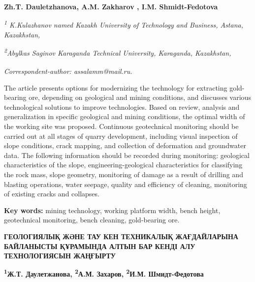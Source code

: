 
\begin{articleheader}

{\bfseries
Zh.T. Dauletzhanova,
A.M. Zakharov\textsuperscript{\envelope } ,
I.M. Shmidt-Fedotova}
\end{articleheader}

\begin{affiliation}
\emph{\textsuperscript{1} K.Kulazhanov named Kazakh University of Technology and Business, Astana, Kazakhstan,}

\emph{\textsuperscript{2}Abylkas Saginov Karaganda Technical University, Karaganda, Kazakhstan,}

\raggedright \textsuperscript{\envelope }{\em Correspondent-author: \emph{assalamm@mail.ru.}}
\end{affiliation}

The article presents options for modernizing the technology for
extracting gold-bearing ore, depending on geological and mining
conditions, and discusses various technological solutions to improve
technologies. Based on review, analysis and generalization in specific
geological and mining conditions, the optimal width of the working site
was proposed. Continuous geotechnical monitoring should be carried out
at all stages of quarry development, including visual inspection of
slope conditions, crack mapping, and collection of deformation and
groundwater data. The following information should be recorded during
monitoring: geological characteristics of the slope,
engineering-geological characteristics for classifying the rock mass,
slope geometry, monitoring of damage as a result of drilling and
blasting operations, water seepage, quality and efficiency of cleaning,
monitoring of existing cracks and collapses.

{\bfseries Key words:} mining technology, working platform width, bench height,
geotechnical monitoring, bench cleaning, gold-bearing ore.

\begin{articleheader}
{\bfseries ГЕОЛОГИЯЛЫҚ ЖӘНЕ ТАУ КЕН ТЕХНИКАЛЫҚ ЖАҒДАЙЛАРЫНА БАЙЛАНЫСТЫ ҚҰРАМЫНДА АЛТЫН БАР КЕНДІ АЛУ ТЕХНОЛОГИЯСЫН ЖАҢҒЫРТУ}

{\bfseries
\textsuperscript{1}Ж.Т. Даулетжанова,
\textsuperscript{2}А.М. Захаров\textsuperscript{\envelope },
\textsuperscript{2}И.М. Шмидт-Федотова}
\end{articleheader}

